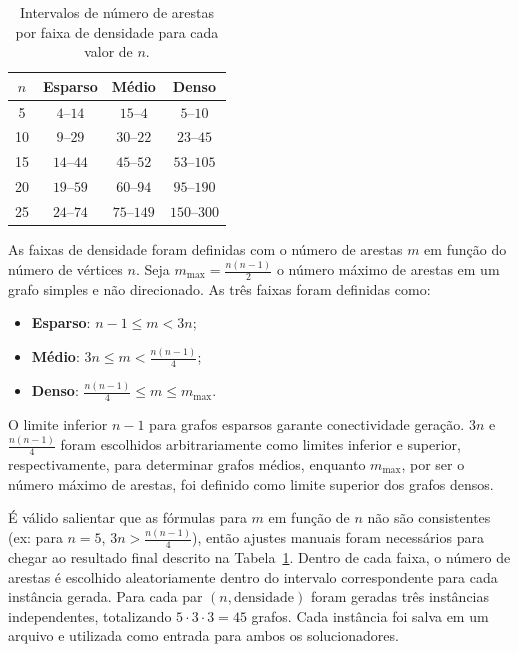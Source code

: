 \begin{table}[H]
    \centering
    \begin{tabular}{|c|c|c|c|}
        \hline
        $n$ & Esparso & Médio & Denso \\
        \hline
        5  & $4$--$14$  & $15$--$4$  & $5$--$10$     \\
        10 & $9$--$29$  & $30$--$22$ & $23$--$45$    \\
        15 & $14$--$44$ & $45$--$52$ & $53$--$105$   \\
        20 & $19$--$59$ & $60$--$94$ & $95$--$190$   \\
        25 & $24$--$74$ & $75$--$149$ & $150$--$300$ \\
        \hline
    \end{tabular}
    \caption{Intervalos de número de arestas por faixa de densidade para cada valor de $n$.}
    \label{tab:faixas-de-densidade}
\end{table}

As faixas de densidade foram definidas com o número de arestas $m$ em função do número de vértices $n$. Seja $m_{\max} = \frac{n(n-1)}{2}$ o número máximo de arestas em um grafo simples e não direcionado. As três faixas foram definidas como:

\begin{itemize}
    \item \textbf{Esparso}: $n-1 \leq m < 3n$;
    \item \textbf{Médio}: $3n \leq m < \frac{n(n-1)}{4}$;
    \item \textbf{Denso}: $\frac{n(n-1)}{4} \leq m \leq m_{\max}$.
\end{itemize}

O limite inferior $n-1$ para grafos esparsos garante conectividade geração. $3n$ e $\frac{n(n-1)}{4}$  foram escolhidos arbitrariamente como limites inferior e superior, respectivamente, para determinar grafos médios, enquanto $m_{\max}$, por ser o número máximo de arestas, foi definido como limite superior dos grafos densos. 

É válido salientar que as fórmulas para $m$ em função de $n$ não são consistentes (ex: para $n=5$, $3n>\frac{n(n-1)}{4}$), então ajustes manuais foram necessários para chegar ao resultado final descrito na Tabela~\ref{tab:faixas-de-densidade}. Dentro de cada faixa, o número de arestas é escolhido aleatoriamente dentro do intervalo correspondente para cada instância gerada. Para cada par $(n,\text{densidade})$ foram geradas três instâncias independentes, totalizando $5 \cdot 3 \cdot 3 = 45$ grafos. Cada instância foi salva em um arquivo e utilizada como entrada para ambos os solucionadores.

